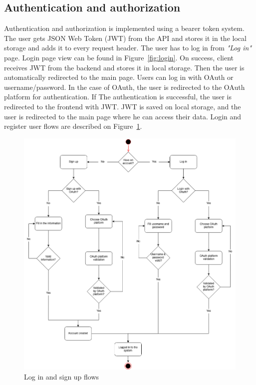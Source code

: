 \subsection{Authentication and authorization}\label{subsec:authentication-and-authorization}
Authentication and authorization is implemented using a bearer token system.
The user gets JSON Web Token (JWT) from the API and stores it in the local storage and adds it to every request header.
The user has to log in from \textit{"Log in"} page.
Login page view can be found in Figure~\ref{fig:login}.
On success, client receives JWT from the backend and stores it in local storage.
Then the user is automatically redirected to the main page.
Users can log in with OAuth or username/password.
In the case of OAuth, the user is redirected to the OAuth platform for authentication.
If The authentication is successful, the user is redirected to the frontend with JWT.
JWT is saved on local storage, and the user is redirected to the main page where he can access their data.
Login and register user flows are described on Figure~\ref{fig:login-signup-diagram}.

\begin{figure}[H]
    \includegraphics[width=\textwidth]{figures/login_signup_user_flow}
    \caption{Log in and sign up flows}
    \label{fig:login-signup-diagram}
\end{figure}

